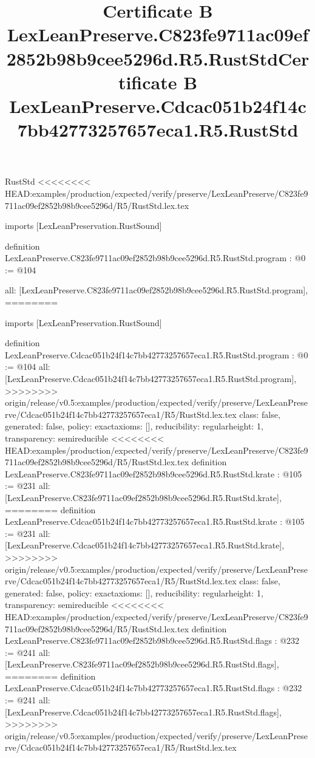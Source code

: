 \begin{lexlean}{RustStd}
<<<<<<<< HEAD:examples/production/expected/verify/preserve/LexLeanPreserve/C823fe9711ac09ef2852b98b9cee5296d/R5/RustStd.lex.tex
\title{Certificate B LexLeanPreserve.C823fe9711ac09ef2852b98b9cee5296d.R5.RustStd}
\begin{coremodule}
imports [LexLeanPreservation.RustSound]

definition LexLeanPreserve.C823fe9711ac09ef2852b98b9cee5296d.R5.RustStd.program : @0 := @104 {
  all: [LexLeanPreserve.C823fe9711ac09ef2852b98b9cee5296d.R5.RustStd.program],
========
\title{Certificate B LexLeanPreserve.Cdcac051b24f14c7bb42773257657eca1.R5.RustStd}
\begin{coremodule}
imports [LexLeanPreservation.RustSound]

definition LexLeanPreserve.Cdcac051b24f14c7bb42773257657eca1.R5.RustStd.program : @0 := @104 {
  all: [LexLeanPreserve.Cdcac051b24f14c7bb42773257657eca1.R5.RustStd.program],
>>>>>>>> origin/release/v0.5:examples/production/expected/verify/preserve/LexLeanPreserve/Cdcac051b24f14c7bb42773257657eca1/R5/RustStd.lex.tex
  class: false,
  generated: false,
  policy: exact{axioms: []},
  reducibility: regular{height: 1},
  transparency: semireducible
}
<<<<<<<< HEAD:examples/production/expected/verify/preserve/LexLeanPreserve/C823fe9711ac09ef2852b98b9cee5296d/R5/RustStd.lex.tex
definition LexLeanPreserve.C823fe9711ac09ef2852b98b9cee5296d.R5.RustStd.krate : @105 := @231 {
  all: [LexLeanPreserve.C823fe9711ac09ef2852b98b9cee5296d.R5.RustStd.krate],
========
definition LexLeanPreserve.Cdcac051b24f14c7bb42773257657eca1.R5.RustStd.krate : @105 := @231 {
  all: [LexLeanPreserve.Cdcac051b24f14c7bb42773257657eca1.R5.RustStd.krate],
>>>>>>>> origin/release/v0.5:examples/production/expected/verify/preserve/LexLeanPreserve/Cdcac051b24f14c7bb42773257657eca1/R5/RustStd.lex.tex
  class: false,
  generated: false,
  policy: exact{axioms: []},
  reducibility: regular{height: 1},
  transparency: semireducible
}
<<<<<<<< HEAD:examples/production/expected/verify/preserve/LexLeanPreserve/C823fe9711ac09ef2852b98b9cee5296d/R5/RustStd.lex.tex
definition LexLeanPreserve.C823fe9711ac09ef2852b98b9cee5296d.R5.RustStd.flags : @232 := @241 {
  all: [LexLeanPreserve.C823fe9711ac09ef2852b98b9cee5296d.R5.RustStd.flags],
========
definition LexLeanPreserve.Cdcac051b24f14c7bb42773257657eca1.R5.RustStd.flags : @232 := @241 {
  all: [LexLeanPreserve.Cdcac051b24f14c7bb42773257657eca1.R5.RustStd.flags],
>>>>>>>> origin/release/v0.5:examples/production/expected/verify/preserve/LexLeanPreserve/Cdcac051b24f14c7bb42773257657eca1/R5/RustStd.lex.tex
}}}
\end{coremodule}}
\end{coremodule}
\end{lexlean}
